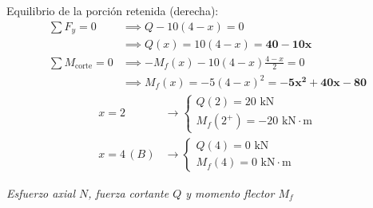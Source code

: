 \begin{center}
\begin{minipage}{0.48\textwidth}
    \end{minipage}\hfill
    \begin{minipage}{0.48\textwidth}
        Equilibrio de la porción retenida (derecha):
        \begin{align*}
            \sum F_y = 0              & \implies Q - 10(4-x) = 0                                \\
                                      & \implies Q(x) = 10(4-x) = \mathbf{40 - 10x}             \\[6pt]
            \sum M_{\text{corte}} = 0 & \implies -M_f(x) - 10(4-x)\frac{4-x}{2} = 0             \\
                                      & \implies M_f(x) = -5(4-x)^2 = \mathbf{-5x^2 + 40x - 80}
        \end{align*}
        \vspace{2pt}
        \begin{equation*}
            \begin{aligned}
                x = 2      & \to \begin{cases} Q(2) = 20\text{ kN} \\ M_f(2^+) = -20\text{ kN}\cdot\text{m} \end{cases} \\[4pt]
                x = 4\,(B) & \to \begin{cases} Q(4) = 0\text{ kN} \\ M_f(4) = 0\text{ kN}\cdot\text{m} \end{cases}
            \end{aligned}
        \end{equation*}
    \end{minipage}
\end{center}


\vspace{1em}
\begin{center}
    \textit{\small Esfuerzo axial $N$, fuerza cortante $Q$ y momento flector $M_f$}
\end{center}

